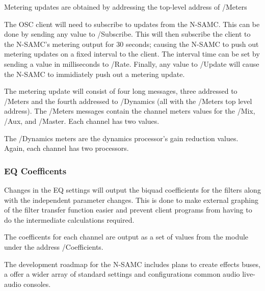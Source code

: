 \documentclass[letterpaper, 12pt, twosided, twocolumn]{article}
\begin{document}
Metering updates are obtained by addressing the top-level address of /Meters

The OSC client will need to subscribe to updates from the N-SAMC. This can be done by sending any value to /Subscribe. This will then subscribe the client to the N-SAMC's metering output for 30 seconds; causing the N-SAMC to push out metering updates on a fixed interval to the client. The interval time can be set by sending a value in milliseconds to /Rate. Finally, any value to /Update will cause the N-SAMC to immidiately push out a metering update.

The metering update will consist of four long messages, three addressed to /Meters and the fourth addressed to /Dynamics (all with the /Meters top level address). The /Meters messages contain the channel meters values for the /Mix, /Aux, and /Master. Each channel has two values.

The /Dynamics meters are the dynamics processor's gain reduction values. Again, each channel has two processors. 

\subsubsection{EQ Coefficents}

Changes in the EQ settings will output the biquad coefficients for the filters along with the independent parameter changes. This is done to make external graphing of the filter transfer function easier and prevent client programs from having to do the intermediate calculations required.

The coefficents for each channel are output as a set of values from the module under the address /Coefficients.


The development roadmap for the N-SAMC includes plans to create effects buses, a offer a wider array of standard settings and configurations common audio live-audio consoles. 
\end{document}
